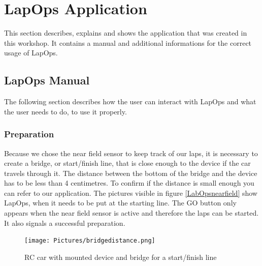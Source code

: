 \chapter{LapOps Application}\label{manual}
This section describes, explains and shows the application that was created in this workshop. It contains a manual and additional informations for the correct usage of LapOps.

\section{LapOps Manual}
The following section describes how the user can interact with LapOps and what the user needs to do, to use it properly.

\subsection{Preparation}\label{prep}
Because we chose the near field sensor to keep track of our laps, it is necessary to create a bridge, or start/finish line, that is close enough to the device if the car travels through it. The distance between the bottom of the bridge and the device has to be less than 4 centimetres. To confirm if the distance is small enough you can refer to our application. The pictures visible in figure \ref{LabOpsnearfield} show LapOps, when it needs to be put at the starting line. The GO button only appears when the near field sensor is active and therefore the laps can be started. It also signals a successful preparation.

\begin{figure}[H]
	\centering
	\texttt{[image: Pictures/bridgedistance.png]}
	\caption{RC car with mounted device and bridge for a start/finish line}
	\label{startFinishLineWithRC}
\end{figure}

